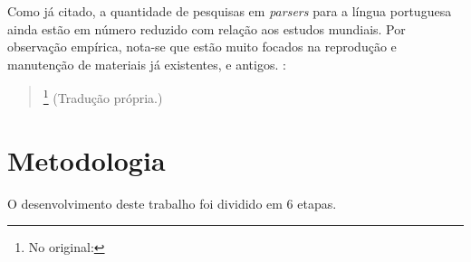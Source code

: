 Como já citado, a quantidade de pesquisas em \textit{parsers} para a língua portuguesa ainda estão em número reduzido com relação aos estudos mundiais. Por observação empírica, nota-se que estão muito focados na reprodução e manutenção de materiais já existentes, e antigos.
\cite[p~371]{Manning1999FoundationsNLP}:
\begin{quote}
    \footnote{No original: }
    (Tradução própria.)
\end{quote}



\section{Metodologia}
\label{sec:metodologia}



O desenvolvimento deste trabalho foi dividido em 6 etapas.

